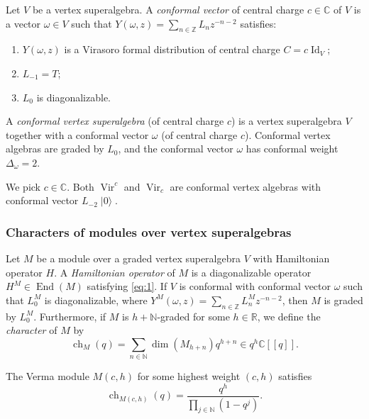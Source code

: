\documentclass{beamer}
\DeclareMathOperator{\Vir}{Vir}
\DeclareMathOperator{\Id}{Id}
\DeclareMathOperator{\End}{End}
\DeclareMathOperator{\ch}{ch}
\DeclareMathOperator{\vac}{|0\rangle}
\begin{document}
\begin{frame}

  Let $V$ be a vertex superalgebra.
  A \emph{conformal vector} of central charge $c \in \mathbb{C}$ of $V$ is a vector $\omega \in V$ such that $Y(\omega, z) = \sum_{n \in \mathbb{Z}}L_nz^{-n - 2}$ satisfies:
  \begin{enumerate}
  \item $Y(\omega, z)$ is a Virasoro formal distribution of central charge $C = c\Id_V$;
  \item $L_{-1} = T$;
  \item $L_0$ is diagonalizable.
  \end{enumerate}

  A \emph{conformal vertex superalgebra} (of central charge $c$) is a vertex superalgebra $V$ together with a conformal vector $\omega$ (of central charge $c$).
  Conformal vertex algebras are graded by $L_0$, and the conformal vector $\omega$ has conformal weight $\Delta_{\omega} = 2$.

  \begin{example}
    We pick $c \in \mathbb{C}$.
    Both $\Vir^c$ and $\Vir_c$ are conformal vertex algebras with conformal vector $L_{-2}\vac$.
  \end{example}

\end{frame}

\begin{frame}
  \frametitle{Characters of modules over vertex superalgebras}

  Let $M$ be a module over a graded vertex superalgebra $V$ with Hamiltonian operator $H$.
  A \emph{Hamiltonian operator} of $M$ is a diagonalizable operator $H^M \in \End(M)$ satisfying \eqref{eq:1}.
  If $V$ is conformal with conformal vector $\omega$ such that $L_0^M$ is diagonalizable, where $Y^M(\omega, z) = \sum_{n \in \mathbb{Z}}L_n^Mz^{-n - 2}$, then $M$ is graded by $L_0^M$.
  Furthermore, if $M$ is $h + \mathbb{N}$-graded for some $h \in \mathbb{R}$, we define the \emph{character} of $M$ by
  \begin{equation*}
    \ch_M(q) = \sum_{n \in \mathbb{N}}\dim(M_{h + n})q^{h + n} \in q^h\mathbb{C}[[q]].
  \end{equation*}

  \begin{example}
    The Verma module $M(c, h)$ for some highest weight $(c, h)$ satisfies
    \begin{equation*}
      \ch_{M(c, h)}(q) = \frac{q^h}{\prod_{j \in \mathbb{N}}(1 - q^j)}.
    \end{equation*}
  \end{example}

\end{frame}
\end{document}
